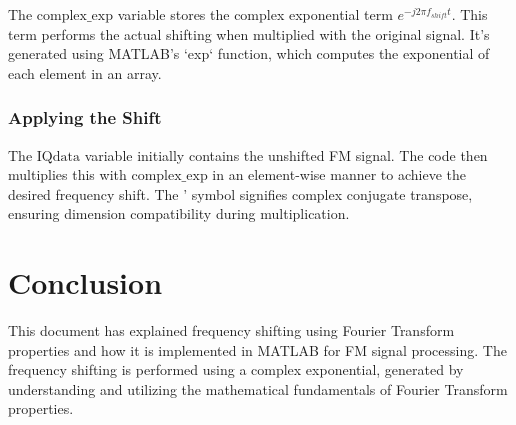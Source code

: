 \documentclass{article}
\begin{document}
The \( \text{complex\_exp} \) variable stores the complex exponential term \( e^{-j 2 \pi f_{shift} t} \). This term performs the actual shifting when multiplied with the original signal. It's generated using MATLAB's `exp` function, which computes the exponential of each element in an array.

\subsubsection{Applying the Shift}

The \( \text{IQdata} \) variable initially contains the unshifted FM signal. The code then multiplies this with \( \text{complex\_exp} \) in an element-wise manner to achieve the desired frequency shift. The ' symbol signifies complex conjugate transpose, ensuring dimension compatibility during multiplication.

\section*{Conclusion}

This document has explained frequency shifting using Fourier Transform properties and how it is implemented in MATLAB for FM signal processing. The frequency shifting is performed using a complex exponential, generated by understanding and utilizing the mathematical fundamentals of Fourier Transform properties.
\end{document}
